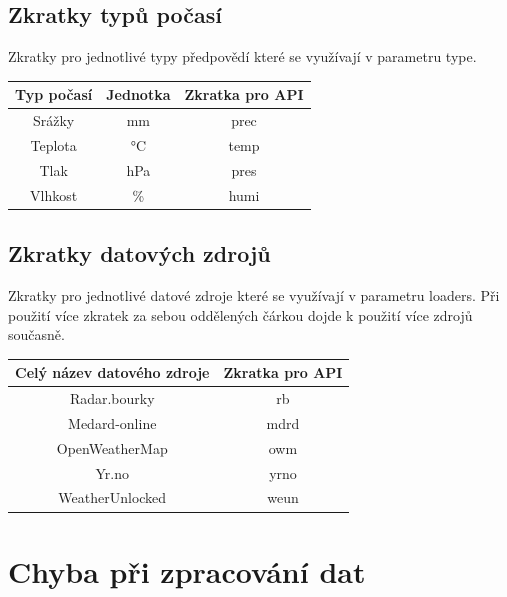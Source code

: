 \documentclass[czech,bachelor,dept460,male,csharp,cpdeclaration]{diploma}
\begin{document}
	\subsection{Zkratky typů počasí}
	
	Zkratky pro jednotlivé typy předpovědí které se využívají v parametru type.
	
	\begin{center}
		
		
		\begin{tabular}{c c c}
			Typ počasí & Jednotka & Zkratka pro API\\
			\midrule
			Srážky & mm & prec \\
			Teplota & °C & temp \\
			Tlak & hPa & pres \\
			Vlhkost & \% & humi \\
		\end{tabular}
	\end{center}
	
	\subsection{Zkratky datových zdrojů}
	
	Zkratky pro jednotlivé datové zdroje které se využívají v parametru loaders. Při použití více zkratek za sebou oddělených čárkou dojde k použití více zdrojů současně.
	
	\begin{center}
		
		
		\begin{tabular}{c c}
			Celý název datového zdroje & Zkratka pro API\\
			\midrule
			Radar.bourky & rb \\
			Medard-online & mdrd \\
			OpenWeatherMap & owm \\
			Yr.no & yrno \\
			WeatherUnlocked & weun \\
		\end{tabular}
	\end{center}
	
	\section{Chyba při zpracování dat}
	
\end{document}
